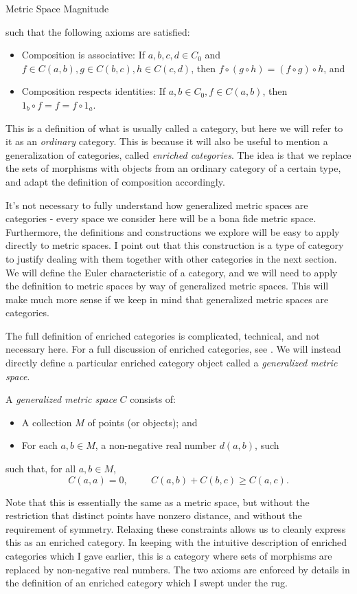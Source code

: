 \documentclass[12pt]{pom_thesis}
\begin{document}
\begin{chapter}{Metric Space Magnitude}
\begin{defn}
\begin{itemize}
\end{itemize}
such that the following axioms are satisfied:
\begin{itemize}
\item Composition is associative: If $a,b,c,d \in C_0$ and $f\in C(a,b), g \in C(b,c), h \in C(c,d)$, then $f \circ (g \circ h) = (f \circ g) \circ h$, and
\item Composition respects identities: If $a,b \in C_0, f \in C(a,b)$, then $1_b \circ f = f = f \circ 1_a$.
\end{itemize}
\end{defn}
This is a definition of what is usually called a category, but here we will refer to it as an \emph{ordinary} category. This is because it will also be useful to mention a generalization of categories, called \emph{enriched categories}. The idea is that we replace the sets of morphisms with objects from an ordinary category of a certain type, and adapt the definition of composition accordingly. 

It's not necessary to fully understand how generalized metric spaces are categories - every space we consider here will be a bona fide metric space. Furthermore, the definitions and constructions we explore will be easy to apply directly to metric spaces. I point out that this construction is a type of category to justify dealing with them together with other categories in the next section. We will define the Euler characteristic of a category, and we will need to apply the definition to metric spaces by way of generalized metric spaces. This will make much more sense if we keep in mind that generalized metric spaces are categories.

The full definition of enriched categories is complicated, technical, and not necessary here. For a full discussion of enriched categories, see \cite{Kelly1}. We will instead directly define a particular enriched category object called a \emph{generalized metric space}.
\begin{defn}
A \emph{generalized metric space} $C$ consists of:
\begin{itemize}
\item A collection $M$ of points (or objects); and
\item For each $a,b \in M$, a non-negative real number $d(a,b)$, such
\end{itemize}
such that, for all $a,b \in M$,
\[C(a,a) = 0,\hspace{1cm} C(a,b) + C(b,c) \geq C(a,c).
\]
\end{defn}
Note that this is essentially the same as a metric space, but without the restriction that distinct points have nonzero distance, and without the requirement of symmetry. Relaxing these constraints allows us to cleanly express this as an enriched category. In keeping with the intuitive description of enriched categories which I gave earlier, this is a category where sets of morphisms are replaced by non-negative real numbers. The two axioms are enforced by details in the definition of an enriched category which I swept under the rug.


\end{chapter}
\end{document}
